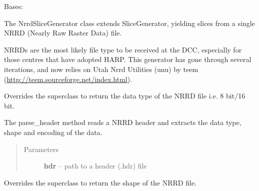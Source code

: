 \documentclass[letterpaper,10pt,english]{sphinxmanual}
\begin{document}

\begin{fulllineitems}
\label{SliceGenerator:SliceGenerator.NrrdSliceGenerator}
Bases: {\hyperref[SliceGenerator:SliceGenerator.SliceGenerator]{}}

The NrrdSliceGenerator class extends SliceGenerator, yielding slices from a single NRRD (Nearly Raw Raster Data)
file.

NRRDs are the most likely file type to be received at the DCC, especially for those centres that have adopted HARP.
This generator has gone through several iterations, and now relies on Utah Nrrd Utilities (unu) by teem
(\href{http://teem.sourceforge.net/index.html}{http://teem.sourceforge.net/index.html}).

\begin{fulllineitems}
\label{SliceGenerator:SliceGenerator.NrrdSliceGenerator.dtype}
Overrides the superclass to return the data type of the NRRD file i.e. 8 bit/16 bit.

\end{fulllineitems}


\begin{fulllineitems}
\label{SliceGenerator:SliceGenerator.NrrdSliceGenerator.parse_header}
The parse\_header method reads a NRRD header and extracts the data type, shape and encoding of the data.
\begin{quote}\begin{description}
\item[{Parameters}] \leavevmode
\textbf{hdr} -- path to a header (.hdr) file

\end{description}\end{quote}

\end{fulllineitems}


\begin{fulllineitems}
\label{SliceGenerator:SliceGenerator.NrrdSliceGenerator.shape}
Overrides the superclass to return the shape of the NRRD file.


\end{fulllineitems}
\end{fulllineitems}
\end{document}
